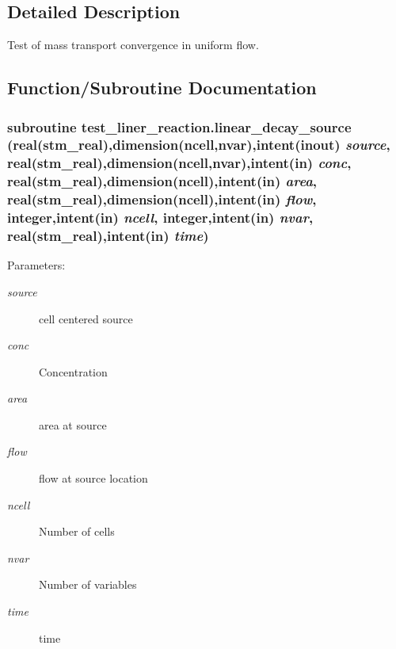 \subsection{Detailed Description}
Test of mass transport convergence in uniform flow. 



\subsection{Function/Subroutine Documentation}
\hypertarget{a00090_ca5e60e57bdca174389beb43b8bc5db7}{
\subsubsection[{linear\_\-decay\_\-source}]{\setlength{\rightskip}{0pt plus 5cm}subroutine test\_\-liner\_\-reaction.linear\_\-decay\_\-source (real(stm\_\-real),dimension(ncell,nvar),intent(inout) {\em source}, \/  real(stm\_\-real),dimension(ncell,nvar),intent(in) {\em conc}, \/  real(stm\_\-real),dimension(ncell),intent(in) {\em area}, \/  real(stm\_\-real),dimension(ncell),intent(in) {\em flow}, \/  integer,intent(in) {\em ncell}, \/  integer,intent(in) {\em nvar}, \/  real(stm\_\-real),intent(in) {\em time})}}
\label{a00090_ca5e60e57bdca174389beb43b8bc5db7}


\begin{Desc}
\item[Parameters:]
\begin{description}
\item[{\em source}]cell centered source \item[{\em conc}]Concentration\item[{\em area}]area at source \item[{\em flow}]flow at source location\item[{\em ncell}]Number of cells\item[{\em nvar}]Number of variables\item[{\em time}]time \end{description}
\end{Desc}

